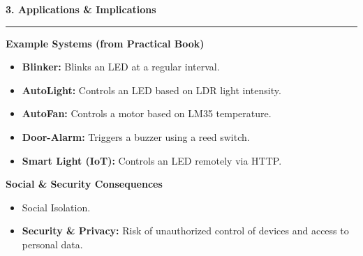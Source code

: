 \documentclass[a4paper, 8pt]{extarticle}
\newcommand{\sectionheading}[1]{\large\textbf{#1}\par\noindent\rule{\linewidth}{0.4pt}}
\newcommand{\subsectionheading}[1]{\normalsize\textbf{#1}}
\begin{document}
\begin{multicols}{2}
\vspace{1em}
\sectionheading{3. Applications \& Implications}
\vspace{0.5em}
\subsectionheading{Example Systems (from Practical Book)}
\begin{itemize}
    \item \textbf{Blinker:} Blinks an LED at a regular interval.
    \item \textbf{AutoLight:} Controls an LED based on LDR light intensity.
    \item \textbf{AutoFan:} Controls a motor based on LM35 temperature.
    \item \textbf{Door-Alarm:} Triggers a buzzer using a reed switch.
    \item \textbf{Smart Light (IoT):} Controls an LED remotely via HTTP.
\end{itemize}

\subsectionheading{Social \& Security Consequences}
\begin{itemize}
    \item Social Isolation.
    \item \textbf{Security \& Privacy:} Risk of unauthorized control of devices and access to personal data.
\end{itemize}


\end{multicols}
\end{document}
